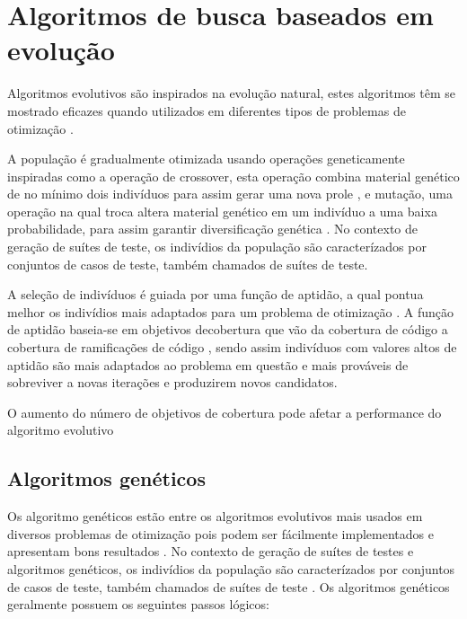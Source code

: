 \documentclass[
	12pt,				%
	oneside,			%
	a4paper,			%
	english,			%
	brazil				%
	]{abntex2ppgsi}
\begin{document}
\section{Algoritmos de busca baseados em evolução}
Algoritmos evolutivos são inspirados na evolução natural, estes algoritmos têm se mostrado eficazes quando utilizados em diferentes tipos de problemas de otimização \cite{Campos2017}.

A população é gradualmente otimizada usando operações geneticamente inspiradas como a operação de crossover, esta operação combina material genético de no mínimo dois indivíduos para assim gerar uma nova prole , e mutação, uma operação na qual troca altera material genético em um indivíduo a uma baixa probabilidade, para assim garantir diversificação genética \cite{Campos2017}. No contexto de geração de suítes de teste, os indivídios da população são caracterízados por conjuntos de casos de teste, também chamados de suítes de teste. \cite{Campos2017}


A seleção de indivíduos é guiada por uma função de aptidão, a qual pontua melhor  os indivídios mais adaptados para um problema de otimização \cite{Campos2017}. A função de aptidão baseia-se em objetivos decobertura que vão da cobertura de código a cobertura de ramificações de código \cite{Campos2017}, sendo assim indivíduos com valores altos de aptidão são mais adaptados ao problema em questão e mais prováveis de sobreviver a novas iterações e produzirem novos candidatos. \cite{Campos2017}

O aumento do número de objetivos de cobertura pode afetar a performance do algoritmo evolutivo \cite{Campos2017}

\subsection{Algoritmos genéticos}

Os algoritmo genéticos estão entre os algoritmos evolutivos mais usados em diversos problemas de otimização pois podem ser fácilmente implementados e apresentam bons resultados  \cite{Campos2017}.  No contexto de geração de suítes de testes e algoritmos genéticos, os indivídios da população são caracterízados por conjuntos de casos de teste, também chamados de suítes de teste \cite{Campos2017}. Os algoritmos genéticos geralmente possuem os seguintes passos lógicos: \\
\end{document}

